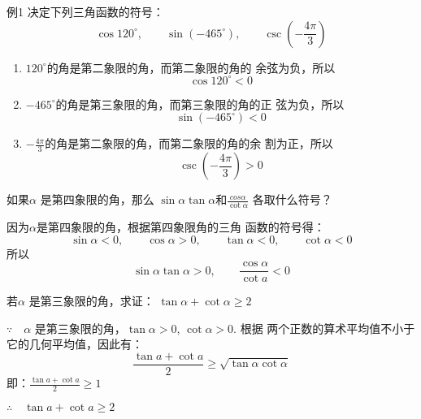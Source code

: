 \begin{example}
    例1 决定下列三角函数的符号：
\[\cos120^{\circ},\qquad \sin(-465^{\circ}),\qquad \csc\left(-\frac{4\pi}{3}\right)\]
\end{example}


\begin{solution}
\begin{enumerate}
    \item $120^{\circ}$的角是第二象限的角，而第二象限的角的
余弦为负，所以$$\cos120^{\circ}<0$$
\item $-465^{\circ}$的角是第三象限的角，而第三象限的角的正
弦为负，所以$$\sin(-465^{\circ})<0$$
\item $-\frac{4\pi}{3}$的角是第二象限的角，而第二象限的角的余
割为正，所以$$\csc\left(-\frac{4\pi}{3}\right)>0$$
\end{enumerate}    
\end{solution}



\begin{example}
    如果$\alpha$ 是第四象限的角，那么
$\sin\alpha \tan \alpha$和$\frac{cos\alpha }{\cot \alpha}$
各取什么符号？
\end{example}

\begin{solution}
    因为$\alpha$是第四象限的角，根据第四象限角的三角
函数的符号得：
\[\sin\alpha <0,\qquad \cos\alpha>0,\qquad  \tan \alpha<0,\qquad \cot \alpha<0\]
所以
\[\sin\alpha \tan \alpha>0,\qquad  \frac{\cos\alpha}{\cot a}<0\]
\end{solution}


\begin{example}
    若$\alpha$ 是第三象限的角，求证：
$\tan \alpha+\cot \alpha\ge 2$
\end{example}

\begin{solution}
    $\because\quad \alpha$ 是第三象限的角，$\tan \alpha>0$, $\cot \alpha>0$. 根据
两个正数的算术平均值不小于它的几何平均值，因此有：
\[\frac{\tan a+\cot a}{2}\ge \sqrt{\tan \alpha \cot \alpha}\]
即：$\frac{\tan a+\cot a}{2}\ge 1$

$\therefore\quad \tan a+\cot a\ge 2$
\end{solution}

